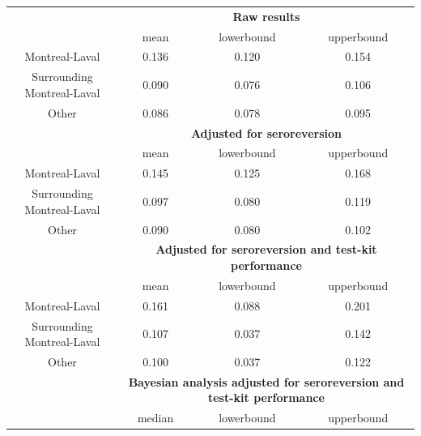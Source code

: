 \begin{table}[]
\centering
\begin{tabular}{c|ccc}
                           & \multicolumn{3}{c}{\textbf{Raw results}}                                        \\
                           & mean                & lowerbound             & upperbound             \\
Montreal-Laval             & 0.136               & 0.120                  & 0.154                  \\
Surrounding Montreal-Laval & 0.090               & 0.076                  & 0.106                  \\
Other                      & 0.086               & 0.078                  & 0.095                  \\
\hline
                           & \multicolumn{3}{c}{\textbf{Adjusted for seroreversion}}                          \\
                           & mean                & lowerbound             & upperbound             \\
Montreal-Laval             & 0.145               & 0.125                  & 0.168                  \\
Surrounding Montreal-Laval & 0.097               & 0.080                  & 0.119                  \\
Other                      & 0.090               & 0.080                  & 0.102                  \\
\hline
                           & \multicolumn{3}{c}{\textbf{Adjusted for seroreversion and test-kit performance}} \\
                           & mean                & lowerbound             & upperbound             \\
Montreal-Laval             & 0.161               & 0.088                  & 0.201                  \\
Surrounding Montreal-Laval & 0.107               & 0.037                  & 0.142                  \\
Other                      & 0.100               & 0.037             & 0.122                  \\
\hline
                           & \multicolumn{3}{c}{\textbf{Bayesian analysis adjusted for seroreversion and test-kit performance}}                                 \\
                           & median              & lowerbound             & upperbound             \\

\end{tabular}
\end{table}
